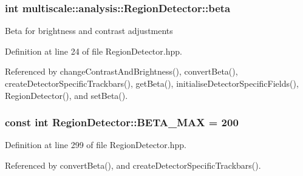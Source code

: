 \hypertarget{classmultiscale_1_1analysis_1_1RegionDetector_a23c831170c2264dd7e59067a1a7d3c8e}{
\subsubsection[{beta}]{\setlength{\rightskip}{0pt plus 5cm}int {\bf multiscale\-::analysis\-::\-Region\-Detector\-::beta}}}\label{classmultiscale_1_1analysis_1_1RegionDetector_a23c831170c2264dd7e59067a1a7d3c8e}
\-Beta for brightness and contrast adjustments 

\-Definition at line 24 of file \-Region\-Detector.\-hpp.



\-Referenced by change\-Contrast\-And\-Brightness(), convert\-Beta(), create\-Detector\-Specific\-Trackbars(), get\-Beta(), initialise\-Detector\-Specific\-Fields(), \-Region\-Detector(), and set\-Beta().

\hypertarget{classmultiscale_1_1analysis_1_1RegionDetector_ad2c6485f637cae5abee0303b41df1480}{
\subsubsection[{\-B\-E\-T\-A\-\_\-\-M\-A\-X}]{\setlength{\rightskip}{0pt plus 5cm}const int {\bf \-Region\-Detector\-::\-B\-E\-T\-A\-\_\-\-M\-A\-X} = 200}}\label{classmultiscale_1_1analysis_1_1RegionDetector_ad2c6485f637cae5abee0303b41df1480}


\-Definition at line 299 of file \-Region\-Detector.\-hpp.



\-Referenced by convert\-Beta(), and create\-Detector\-Specific\-Trackbars().

